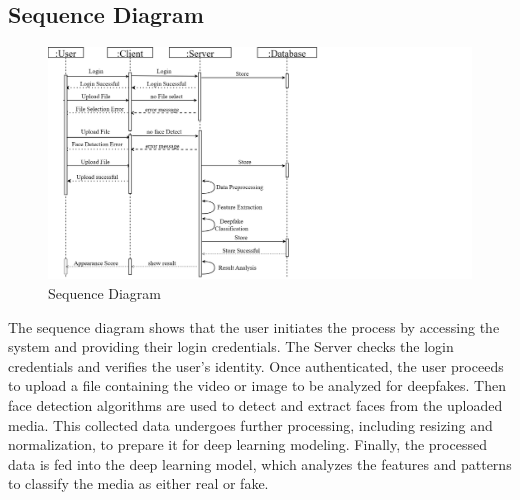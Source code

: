 \subsection{Sequence Diagram}

\begin{figure}[h]
    \centering
    \includegraphics[width=8in]{img/sequencediagram.drawio.png}
    \caption{Sequence Diagram}
\end{figure}

\justify
The sequence diagram shows that the user initiates the process by accessing the system and providing their login credentials. The Server checks the login credentials and verifies the user's identity. Once authenticated, the user proceeds to upload a file containing the video or image to be analyzed for deepfakes. Then face detection algorithms are used to detect and extract faces from the uploaded media. This collected data undergoes further processing, including resizing and normalization, to prepare it for deep learning modeling. Finally, the processed data is fed into the deep learning model, which analyzes the features and patterns to classify the media as either real or fake.
